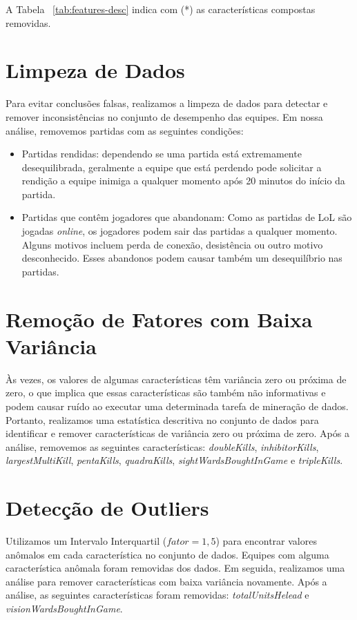 A Tabela ~\ref{tab:features-desc} indica com (*) as características compostas removidas.

\section{Limpeza de Dados}
Para evitar conclusões falsas, realizamos a limpeza de dados para detectar e remover inconsistências no conjunto de desempenho das equipes. Em nossa análise, removemos partidas com as seguintes condições:

\begin{itemize}
\item Partidas rendidas: dependendo se uma partida está extremamente desequilibrada, geralmente a equipe que está perdendo pode solicitar a rendição a equipe inimiga a qualquer momento após 20 minutos do início da partida.
\item Partidas que contêm jogadores que abandonam: Como as partidas de LoL são jogadas \textit{online}, os jogadores podem sair das partidas a qualquer momento. Alguns motivos incluem perda de conexão, desistência ou outro motivo desconhecido. Esses abandonos podem causar também um desequilíbrio nas partidas.
\end{itemize}

\section{Remoção de Fatores com Baixa Variância}
Às vezes, os valores de algumas características têm variância zero ou próxima de zero, o que implica que essas características são também não informativas e podem causar ruído ao executar uma determinada tarefa de mineração de dados. Portanto, realizamos uma estatística descritiva no conjunto de dados para identificar e remover características de variância zero ou próxima de zero. Após a análise, removemos as seguintes características: \textit{doubleKills}, \textit{inhibitorKills}, \textit {largestMultiKill}, \textit{pentaKills}, \textit {quadraKills}, \textit {sightWardsBoughtInGame} e \textit{tripleKills}.

\section{Detecção de Outliers}
Utilizamos um Intervalo Interquartil ($fator = 1,5 $) para encontrar valores anômalos em cada característica no conjunto de dados. Equipes com alguma característica anômala foram removidas dos dados. Em seguida, realizamos uma análise para remover características com baixa variância novamente. Após a análise, as seguintes características foram removidas: \textit{totalUnitsHelead} e \textit{visionWardsBoughtInGame}.

